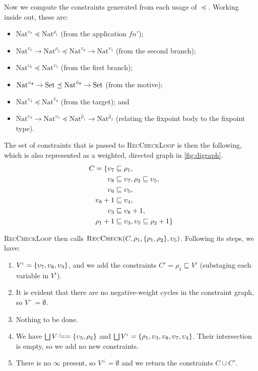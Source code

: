 \documentclass[acmsmall,screen,review,10pt]{acmart} %
\begin{document}
Now we compute the constraints generated from each usage of $\preceq$. Working inside out, these are:
\begin{itemize}
    \item $\text{Nat}^{\upsilon_7} \preceq \text{Nat}^{\rho_1}$ (from the application $f n'$);
    \item $\text{Nat}^{\upsilon_7} \to \text{Nat}^{\rho_2} \preceq \text{Nat}^{\upsilon_8} \to \text{Nat}^{\upsilon_5}$ (from the second branch);
    \item $\text{Nat}^{\upsilon_6} \preceq \text{Nat}^{\upsilon_5}$ (from the first branch);
    \item $\text{Nat}^{\upsilon_4} \to \text{Set} \preceq \text{Nat}^{\hat{\upsilon}_8} \to \text{Set}$ (from the motive);
    \item $\text{Nat}^{\upsilon_3} \preceq \text{Nat}^{\hat{\upsilon}_8}$ (from the target); and
    \item $\text{Nat}^{\upsilon_3} \to \text{Nat}^{\upsilon_5} \preceq \text{Nat}^{\hat{\rho}_1} \to \text{Nat}^{\hat{\rho}_2}$ (relating the fixpoint body to the fixpoint type).
\end{itemize}

The set of constraints that is passed to \textsc{RecCheckLoop} is then the following, which is also represented as a weighted, directed graph in \autoref{fig:digraph}.
\begin{align*}
    C = \{\upsilon_7 &\sqsubseteq \rho_1, \\
    \upsilon_8 &\sqsubseteq \upsilon_7, \rho_2 \sqsubseteq \upsilon_5, \\
    \upsilon_6 &\sqsubseteq \upsilon_5, \\
    \upsilon_8+1 &\sqsubseteq \upsilon_4, \\
    \upsilon_3 &\sqsubseteq \upsilon_8+1, \\
    \rho_1+1 &\sqsubseteq \upsilon_3, \upsilon_5 \sqsubseteq \rho_2+1\}
\end{align*}



\textsc{RecCheckLoop} then calls $\textsc{RecCheck}(C, \rho_1, \{\rho_1, \rho_2\}, \upsilon_5)$. Following its steps, we have:
\begin{enumerate}
    \item $V^\iota = \{\upsilon_7, \upsilon_8, \upsilon_3\}$, and we add the constraints $C' = \rho_1 \sqsubseteq V^\iota$ (substaging each variable in $V^\iota$).
    \item It is evident that there are no negative-weight cycles in the constraint graph, so $V^- = \emptyset$.
    \item Nothing to be done.
    \item We have $\bigsqcup V^\neq = \{\upsilon_5, \rho_2\}$ and $\bigsqcup V^\iota = \{\rho_1, \upsilon_3, \upsilon_8, \upsilon_7, \upsilon_4\}$. Their intersection is empty, so we add no new constraints.
    \item There is no $\infty$ present, so $V^\bot = \emptyset$ and we return the constraints $C \cup C'$.
\end{enumerate}
\end{document}
